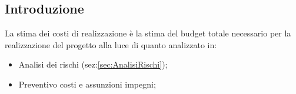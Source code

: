 \subsection{Introduzione}
La stima dei costi di realizzazione è la stima del budget totale necessario per la realizzazione del progetto alla luce di quanto analizzato in: 
\begin{itemize}
    \item Analisi dei rischi (sez:\ref{sec:AnalisiRischi});
    \item Preventivo costi e assunzioni impegni;
\end{itemize}
